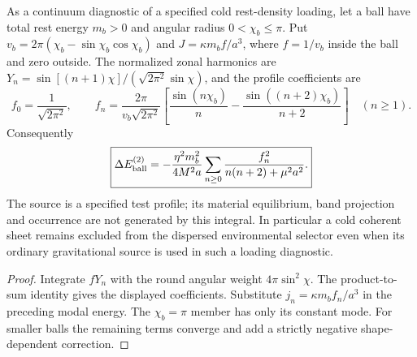 \documentclass[12pt,a4paper]{article}
\begin{document}
\begin{proposition}
\label{p8:prop:v2206-uniform-ball-energy}
As a continuum diagnostic of a specified cold rest-density loading,
let a ball have total rest energy $m_b>0$ and angular radius
$0<\chi_b\le\pi$. Put
$v_b=2\pi(\chi_b-\sin\chi_b\cos\chi_b)$ and
$J=\kappa m_b f/a^3$, where $f=1/v_b$ inside the ball and zero outside.
The normalized zonal harmonics are
$Y_n=\sin[(n+1)\chi]/(\sqrt{2\pi^2}\sin\chi)$, and the profile coefficients are
\[
 f_0=\frac1{\sqrt{2\pi^2}},\qquad
 f_n=\frac{2\pi}{v_b\sqrt{2\pi^2}}
 \left[\frac{\sin(n\chi_b)}n
       -\frac{\sin((n+2)\chi_b)}{n+2}\right]\quad(n\ge1).
\]
Consequently
\begin{equation}
\label{p8:eq:v2206-uniform-ball-energy}
 \boxed{\Delta E_{\rm ball}^{(2)}
 =-\frac{\eta^2m_b^2}{4M^2a}
 \sum_{n\ge0}\frac{f_n^2}{n(n+2)+\mu^2a^2}.}
\end{equation}
The source is a specified test profile; its material equilibrium, band
projection and occurrence are not generated by this integral. In
particular a cold coherent sheet remains excluded from the dispersed
environmental selector even when its ordinary gravitational source is
used in such a loading diagnostic.
\end{proposition}
\begin{proof}
Integrate $fY_n$ with the round angular weight $4\pi\sin^2\chi$.
The product-to-sum identity gives the displayed coefficients. Substitute
$j_n=\kappa m_b f_n/a^3$ in the preceding modal energy. The $\chi_b=\pi$
member has only its constant mode. For smaller balls the remaining
terms converge and add a strictly negative shape-dependent correction.
\end{proof}
\end{document}
